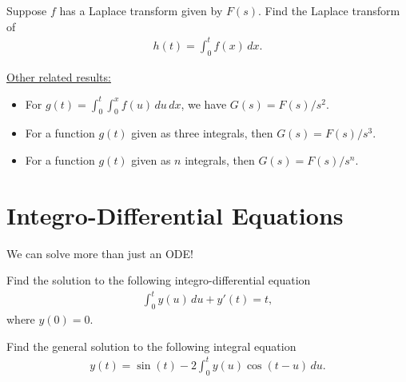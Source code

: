 \documentclass[12pt,a4paper]{article}
\newcounter{example}[section]
\begin{document}
	\vspace*{16pt}
	
	\begin{example}
	Suppose $f$ has a Laplace transform given by $F(s)$. Find the Laplace transform of
		\begin{align*}
		h(t) = \int_0^t f(x) \, dx .
		\end{align*}
	\end{example}
	
	\vfill
	
	\underline{Other related results:}
		\begin{itemize}
		\item For $g(t) = \displaystyle \int_0^t \int_0^{x} f(u) \, du \, dx$, we have $G(s) = F(s)/s^2$.
		\item For a function $g(t)$ given as three integrals, then $G(s) = F(s)/s^3$.
		\item For a function $g(t)$ given as $n$ integrals, then $G(s) = F(s)/s^n$.
		\end{itemize}
	
	\newpage
	
	\section{Integro-Differential Equations}
	We can solve more than just an ODE!
	
	\vspace*{16pt}
	
	\begin{example}
	Find the solution to the following integro-differential equation
		\begin{align*}
		\int_0^t y(u) \, du + y'(t) = t,
		\end{align*}
	where $y(0) = 0$.
	\end{example}
	
	\newpage
	
	\begin{example}
	Find the general solution to the following integral equation
		\begin{align*}
		y(t) = \sin (t) - 2 \int_0^t y(u) \cos (t - u) \, du .
		\end{align*}
	\end{example}
	
	
\end{document}
